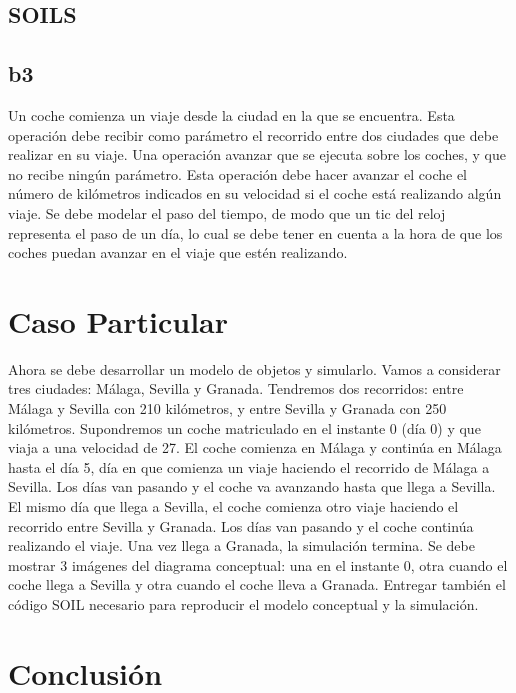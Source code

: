 \documentclass[12pt.a4paper]{article}
\begin{document}
\subsection{SOILS}
    
\subsection{b3}
Un coche comienza un viaje desde la ciudad en la que se encuentra. Esta operación debe recibir como parámetro el recorrido entre dos ciudades que debe realizar en su viaje.
Una operación avanzar que se ejecuta sobre los coches, y que no recibe ningún parámetro. Esta operación debe hacer avanzar el coche el número de kilómetros indicados en su velocidad si el coche está realizando algún viaje. Se debe modelar el paso del tiempo, de modo que un tic del reloj representa el paso de un día, lo cual se debe tener en cuenta a la hora de que los coches puedan avanzar en el viaje que estén realizando.

\newpage
\section{Caso Particular}
Ahora se debe desarrollar un modelo de objetos y simularlo. Vamos a considerar tres ciudades: Málaga, Sevilla y Granada. Tendremos dos recorridos: entre Málaga y Sevilla con 210 kilómetros, y entre Sevilla y Granada con 250 kilómetros. Supondremos un coche matriculado en el instante 0 (día 0) y que viaja a una velocidad de 27. El coche comienza en Málaga y continúa en Málaga hasta el día 5, día en que comienza un viaje haciendo el recorrido de Málaga a Sevilla. Los días van pasando y el coche va avanzando hasta que llega a Sevilla. El mismo día que llega a Sevilla, el coche comienza otro viaje haciendo el recorrido entre Sevilla y Granada. Los días van pasando y el coche continúa realizando el viaje. Una vez llega a Granada, la simulación termina.
Se debe mostrar 3 imágenes del diagrama conceptual: una en el instante 0, otra cuando el coche llega a Sevilla y otra cuando el coche lleva a Granada. Entregar también el código SOIL necesario para reproducir el modelo conceptual y la simulación.


\newpage
\section{Conclusión}
\lipsum[]
\end{document}
